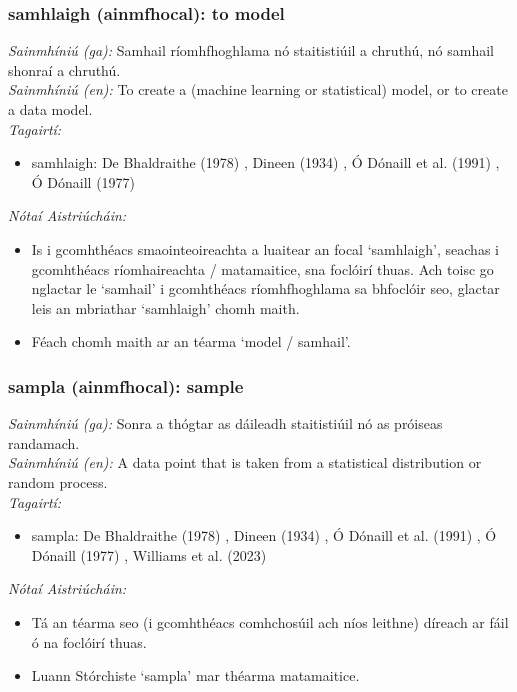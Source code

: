 \subsubsection*{samhlaigh (ainmfhocal): to model}
 \noindent \textit{Sainmhíniú (ga):} Samhail ríomhfhoghlama nó staitistiúil a chruthú, nó samhail shonraí a chruthú.
\\
 \noindent \textit{Sainmhíniú (en):} To create a (machine learning or statistical) model, or to create a data model.
\\
 \noindent \textit{Tagairtí:}
\begin{itemize}
	\item samhlaigh: De Bhaldraithe (1978) \cite{de-bhaldraithe}, Dineen (1934) \cite{dineen}, Ó Dónaill et al. (1991) \cite{focloir-beag}, Ó Dónaill (1977) \cite{odonaill}
\end{itemize}

 \noindent \textit{Nótaí Aistriúcháin:}
\begin{itemize}
	\item Is i gcomhthéacs smaointeoireachta a luaitear an focal `samhlaigh', seachas i gcomhthéacs ríomhaireachta / matamaitice, sna foclóirí thuas. Ach toisc go nglactar le `samhail' i gcomhthéacs ríomhfhoghlama sa bhfoclóir seo, glactar leis an mbriathar `samhlaigh' chomh maith.
	\item Féach chomh maith ar an téarma `model / samhail'.
\end{itemize}


\subsubsection*{sampla (ainmfhocal): sample}
 \noindent \textit{Sainmhíniú (ga):} Sonra a thógtar as dáileadh staitistiúil nó as próiseas randamach.
\\
 \noindent \textit{Sainmhíniú (en):} A data point that is taken from a statistical distribution or random process.
\\
 \noindent \textit{Tagairtí:}
\begin{itemize}
	\item sampla: De Bhaldraithe (1978) \cite{de-bhaldraithe}, Dineen (1934) \cite{dineen}, Ó Dónaill et al. (1991) \cite{focloir-beag}, Ó Dónaill (1977) \cite{odonaill}, Williams et al. (2023) \cite{storchiste}
\end{itemize}

 \noindent \textit{Nótaí Aistriúcháin:}
\begin{itemize}
	\item Tá an téarma seo (i gcomhthéacs comhchosúil ach níos leithne) díreach ar fáil ó na foclóirí thuas.
	\item Luann Stórchiste `sampla' mar théarma matamaitice.
\end{itemize}


